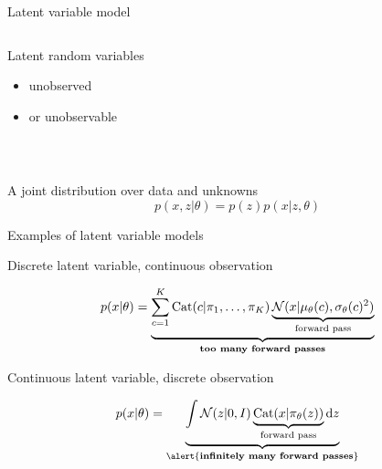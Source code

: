 \documentclass[14pt]{beamer}
\begin{document}
\begin{frame}{Latent variable model}

\begin{columns}
\begin{column}{0.6\textwidth}
Latent random variables
\begin{itemize}
	\item unobserved 
	\item or unobservable
\end{itemize}
\end{column}
\begin{column}{0.2\textwidth}

\end{column}
\end{columns}

~ \pause


A joint distribution over data and unknowns
\begin{equation*}
p(x, z|\theta) = p(z) p(x|z, \theta)
\end{equation*}

\end{frame}


\begin{frame}{Examples of latent variable models}



Discrete latent variable, continuous observation
	\begin{small}
	\begin{equation*}
	p(x|\theta) = \underbrace{\sum_{c=1}^K \operatorname{Cat}(c|\pi_1, \ldots, \pi_K) \underbrace{\mathcal N(x|\mu_\theta(c), \sigma_\theta(c)^2)}_{\text{forward pass}}}_{\text{{\bf too many forward passes}}}
	\end{equation*}
	\end{small} 

	\pause
	
Continuous latent variable, discrete observation
	\begin{small}
	\begin{equation*}
	p(x|\theta) = \underbrace{\int \mathcal N(z|0, I) \underbrace{\Cat(x|\pi_\theta(z))}_{\text{forward pass}} \mathrm{d}z }_{\text{\alert{{\bf infinitely many forward passes}}}}
	\end{equation*}
	\end{small}

\end{frame}
\end{document}
